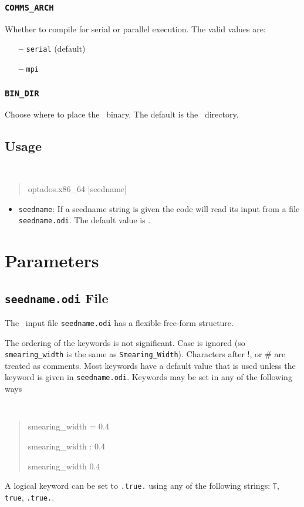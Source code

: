 \documentclass[a4paper,11pt,twoside]{book}
\begin{document}
\subsection[comms_arch]{\tt COMMS\_ARCH}

Whether to compile for serial or parallel execution. The valid values are:
\begin{itemize}
\item[{\bf --}]  \verb#serial# (default) 
\item[{\bf --}]  \verb#mpi# 
\end{itemize}

\subsection[bin_dir]{\tt BIN\_DIR}
Choose where to place the \optados\ binary. The default is the \optados\ directory.


\section{Usage}
{\tt
\begin{quote}
optados.x86\_64  [seedname]
\end{quote} }
\begin{itemize}
\item{  {\tt seedname}: If a seedname string is given the code will read its input from a file {\tt seedname.odi}. The default value is \castep.}
\end{itemize}

\chapter{Parameters}\label{chap:parameters}

\section{{\tt seedname.odi} File}
The \optados\ input file {\tt seedname.odi} has a flexible free-form
structure. 

The ordering of the keywords is not significant. Case is ignored (so
\verb#smearing_width# is the same as \verb#Smearing_Width#). Characters after !, or \#
are treated as comments. Most keywords have a default value that is
used unless the keyword is given in {\tt seedname.odi}. Keywords may be set
in any of the following ways
{\tt
\begin{quote}
smearing\_width = 0.4

smearing\_width : 0.4

smearing\_width   0.4
\end{quote} }
A logical keyword can be set to {\tt .true.} using any of the following
strings: {\tt T}, {\tt true}, {\tt .true.}.
\end{document}
